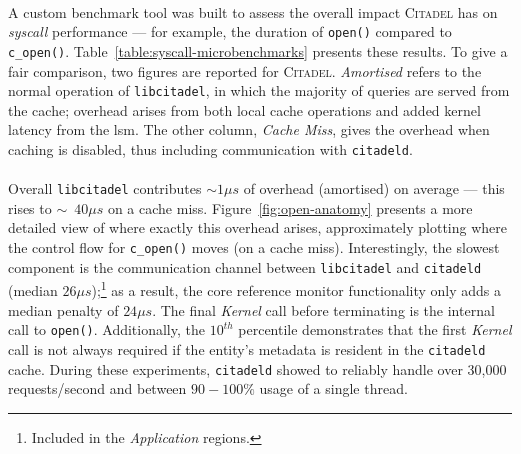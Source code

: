 \paragraph{} A custom benchmark tool was built to assess the overall impact \textsc{Citadel} has on \textit{syscall} performance --- for example, the duration of \texttt{open()} compared to \texttt{c\_open()}. Table~\ref{table:syscall-microbenchmarks} presents these results. To give a fair comparison, two figures are reported for \textsc{Citadel}. \textit{Amortised} refers to the normal operation of \texttt{libcitadel}, in which the majority of queries are served from the cache; overhead arises from both local cache operations and added kernel latency from the \acrshort{lsm}. The other column, \textit{Cache Miss}, gives the overhead when caching is disabled, thus including communication with \texttt{citadeld}.

\paragraph{} Overall \texttt{libcitadel} contributes $\sim{}1 \mu s$ of overhead (amortised) on average --- this rises to $\sim$~$40 \mu s$ on a cache miss. Figure~\ref{fig:open-anatomy} presents a more detailed view of where exactly this overhead arises, approximately plotting where the control flow for \texttt{c\_open()} moves (on a cache miss). Interestingly, the slowest component is the communication channel between \texttt{libcitadel} and \texttt{citadeld} (median $26\mu s$);\footnote{Included in the \textit{Application} regions.} as a result, the core reference monitor functionality only adds a median penalty of $24\mu s$. The final \textit{Kernel} call before terminating is the internal call to \texttt{open()}. Additionally, the $10^{th}$ percentile demonstrates that the first \textit{Kernel} call is not always required if the entity's metadata is resident in the \texttt{citadeld} cache. During these experiments, \texttt{citadeld} showed to reliably handle over 30,000 requests/second and between $90-100\%$ usage of a single thread.

